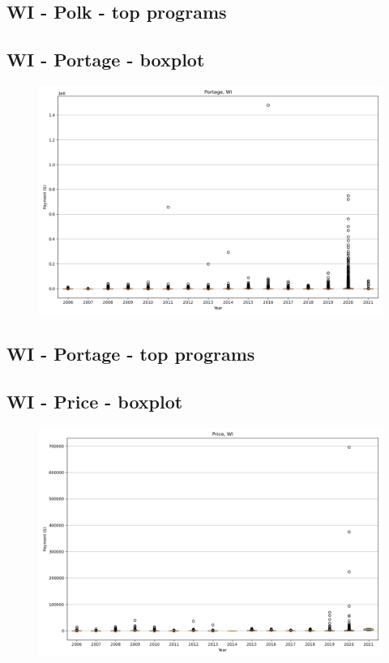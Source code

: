 \subsection*{WI - Polk - top programs}

\newpage
\subsection*{WI - Portage - boxplot}
\begin{figure}[h]
\centering
\includegraphics[width=7in]{../output/boxplots/counties/Portage-WI_boxplot.png}
\end{figure}


\subsection*{WI - Portage - top programs}

\newpage
\subsection*{WI - Price - boxplot}
\begin{figure}[h]
\centering
\includegraphics[width=7in]{../output/boxplots/counties/Price-WI_boxplot.png}
\end{figure}


